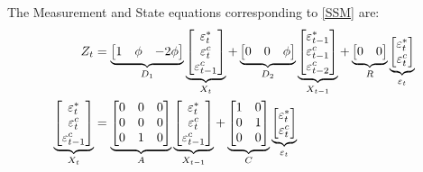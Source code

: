 \documentclass[a4paper,12pt]{article}
\newcommand{\bsq}{\begin{subequations}}\newcommand{\esq}{\end{subequations}}
\begin{document}
The Measurement and State equations corresponding to \ref{SSM} are:\bsq\label%
{K0SSM}%
\begin{align}
Z_{t}& =\underbrace{%
\begin{bmatrix}
1 & \phi  & -2\phi 
\end{bmatrix}%
}_{D_{1}}\underbrace{%
\begin{bmatrix}
\varepsilon _{t}^{\ast } \\ 
\varepsilon _{t}^{c} \\ 
\varepsilon _{t-1}^{c}%
\end{bmatrix}%
}_{X_{t}}+\underbrace{%
\begin{bmatrix}
0 & 0 & \phi 
\end{bmatrix}%
}_{D_{2}}\underbrace{%
\begin{bmatrix}
\varepsilon _{t-1}^{\ast } \\ 
\varepsilon _{t-1}^{c} \\ 
\varepsilon _{t-2}^{c}%
\end{bmatrix}%
}_{X_{t-1}}+\underbrace{%
\begin{bmatrix}
0 & 0%
\end{bmatrix}%
}_{R}\underbrace{%
\begin{bmatrix}
\varepsilon _{t}^{\ast } \\ 
\varepsilon _{t}^{c}%
\end{bmatrix}%
}_{\varepsilon _{t}} \\
\underbrace{%
\begin{bmatrix}
\varepsilon _{t}^{\ast } \\ 
\varepsilon _{t}^{c} \\ 
\varepsilon _{t-1}^{c}%
\end{bmatrix}%
}_{X_{t}}& =\underbrace{%
\begin{bmatrix}
0 & 0 & 0 \\ 
0 & 0 & 0 \\ 
0 & 1 & 0%
\end{bmatrix}%
}_{A}\underbrace{%
\begin{bmatrix}
\varepsilon _{t}^{\ast } \\ 
\varepsilon _{t}^{c} \\ 
\varepsilon _{t-1}^{c}%
\end{bmatrix}%
}_{X_{t-1}}+\underbrace{%
\begin{bmatrix}
1 & 0 \\ 
0 & 1 \\ 
0 & 0%
\end{bmatrix}%
}_{C}\underbrace{%
\begin{bmatrix}
\varepsilon _{t}^{\ast } \\ 
\varepsilon _{t}^{c}%
\end{bmatrix}%
}_{\varepsilon _{t}}
\end{align}%
\esq$\allowbreak $
\end{document}

